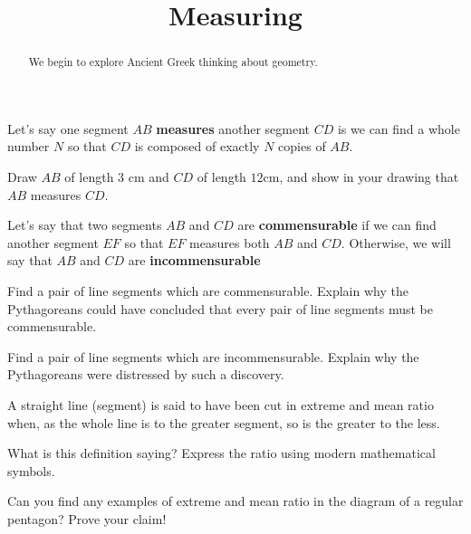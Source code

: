 \documentclass[nooutcomes]{ximera}
\title{Measuring}
\begin{document}
\begin{abstract}
    We begin to explore Ancient Greek thinking about geometry.
\end{abstract}
\maketitle

\begin{definition}
Let's say one segment $AB$ {\bf measures} another segment $CD$ is we can find a whole number $N$ so that $CD$ is composed of exactly $N$ copies of $AB$.
\end{definition}

\begin{problem}
Draw $AB$ of length $3$ cm and $CD$ of length $12$cm, and show in your drawing that $AB$ measures $CD$.
\end{problem}

\begin{definition}
Let's say that two segments $AB$ and $CD$ are {\bf commensurable} if we can find another segment $EF$ so that $EF$ measures both $AB$ and $CD$. Otherwise, we will say that $AB$ and $CD$ are {\bf incommensurable}
\end{definition}


\begin{problem}
Find a pair of line segments which are commensurable. Explain why the Pythagoreans could have concluded that every pair of line segments must be commensurable.
\end{problem}

\begin{problem}
Find a pair of line segments which are incommensurable. Explain why the Pythagoreans were distressed by such a discovery.
\end{problem}

\begin{definition}
A straight line (segment) is said to have been cut in extreme and mean ratio when, as the whole line is to the greater segment, so is the greater to the less.
\end{definition}

\begin{problem}
What is this definition saying? Express the ratio using modern mathematical symbols.
\begin{center}
\end{center}
\end{problem}

\begin{question}
Can you find any examples of extreme and mean ratio in the diagram of a regular pentagon? Prove your claim!
\end{question}
\end{document}
